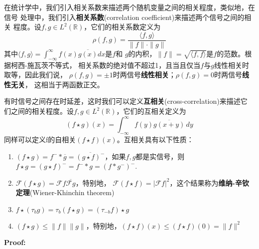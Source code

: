 \documentclass{ctexbook}
\begin{document}
在统计学中，我们引入相关系数来描述两个随机变量之间的相关程度，类似地，在信号
处理中，我们引入\textbf{相关系数}(correlation coefficient)来描述两个信号之间的相关
程度。设$f,g\in L^2(\mathbb{R})$，它们的相关系数定义为
\begin{equation}
    \rho(f,g)=\frac{\langle f,g\rangle}{\|f\|\cdot\|g\|}
\end{equation}
其中$\langle f,g\rangle=\int_{-\infty}^{\infty}f(x)\overline{g(x)}dx$是$f$和
$g$的内积，$\|f\|=\sqrt{\langle f,f\rangle}$是$f$的范数。根据柯西-施瓦茨不等式，
相关系数的绝对值不超过1，且当且仅当$f$与$g$线性相关时取等，因此我们说，
$\rho(f,g)=\pm 1$时两信号\textbf{线性相关}；$\rho(f,g)=0$时两信号\textbf{线性无关}，
这相当于两函数正交。

有时信号之间存在时延差，这时我们可以定义\textbf{互相关}(cross-correlation)来描述它
们之间的相关程度。设$f,g\in L^2(\mathbb{R})$，它们的互相关定义为
\begin{equation}
    (f\star g)(x)=\int_{-\infty}^{\infty}f(y)\overline{g(x+y)}\,dy
\end{equation}
同样可以定义f的自相关$(f\star f)(x)$。互相关具有以下性质：
\begin{enumerate}
    \item $(f\star g) =f^-* \overline{g}=\overline{(g\star f)^-}$，如果$f,g$都是实信号，则$f\star g = (g\star f)^- =f^- *g=(f*g^-)^-$.
    \item $\mathcal{F} (f\star g) =\mathcal{F} f\overline{\mathcal{F} g}$，特别地，
          $\mathcal{F} (f\star f) =|\mathcal{F} f|^2$，这个结果称为\textbf{维纳-辛钦定理}(Wiener-Khinchin theorem)
    \item $f\star (\tau_b g)=\tau_{b} (f\star g)=(\tau_{-b}f)\star g$
    \item $(f\star g)\leq\|f\|\|g\|$，特别地，$(f\star f)(x)\leq (f\star f)(0)=\|f\|^2$
\end{enumerate}
\textbf{Proof:}
\end{document}
